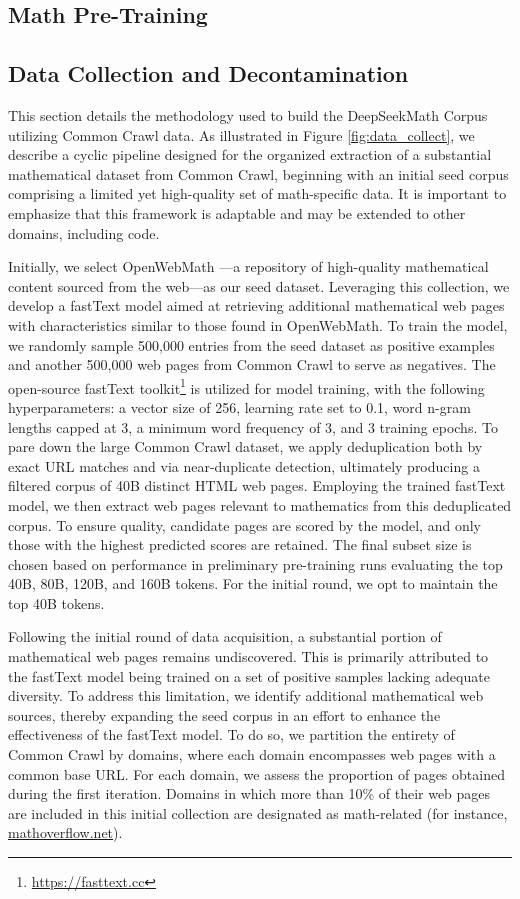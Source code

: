 \begin{itemize}[topsep=0pt]
\section{Math Pre-Training}

\subsection{Data Collection and Decontamination} This section details the methodology used to build the DeepSeekMath Corpus utilizing Common Crawl data. As illustrated in Figure \ref{fig:data_collect}, we describe a cyclic pipeline designed for the organized extraction of a substantial mathematical dataset from Common Crawl, beginning with an initial seed corpus comprising a limited yet high-quality set of math-specific data. It is important to emphasize that this framework is adaptable and may be extended to other domains, including code.

Initially, we select OpenWebMath \citep{openwebmath}—a repository of high-quality mathematical content sourced from the web—as our seed dataset. Leveraging this collection, we develop a fastText model \citep{joulin2016fasttext} aimed at retrieving additional mathematical web pages with characteristics similar to those found in OpenWebMath. To train the model, we randomly sample 500,000 entries from the seed dataset as positive examples and another 500,000 web pages from Common Crawl to serve as negatives. The open-source fastText toolkit\footnote{\url{https://fasttext.cc}} is utilized for model training, with the following hyperparameters: a vector size of 256, learning rate set to 0.1, word n-gram lengths capped at 3, a minimum word frequency of 3, and 3 training epochs. To pare down the large Common Crawl dataset, we apply deduplication both by exact URL matches and via near-duplicate detection, ultimately producing a filtered corpus of 40B distinct HTML web pages. Employing the trained fastText model, we then extract web pages relevant to mathematics from this deduplicated corpus. To ensure quality, candidate pages are scored by the model, and only those with the highest predicted scores are retained. The final subset size is chosen based on performance in preliminary pre-training runs evaluating the top 40B, 80B, 120B, and 160B tokens. For the initial round, we opt to maintain the top 40B tokens.

Following the initial round of data acquisition, a substantial portion of mathematical web pages remains undiscovered. This is primarily attributed to the fastText model being trained on a set of positive samples lacking adequate diversity. To address this limitation, we identify additional mathematical web sources, thereby expanding the seed corpus in an effort to enhance the effectiveness of the fastText model. To do so, we partition the entirety of Common Crawl by domains, where each domain encompasses web pages with a common base URL. For each domain, we assess the proportion of pages obtained during the first iteration. Domains in which more than 10\% of their web pages are included in this initial collection are designated as math-related (for instance, \url{mathoverflow.net}).


\end{itemize}
